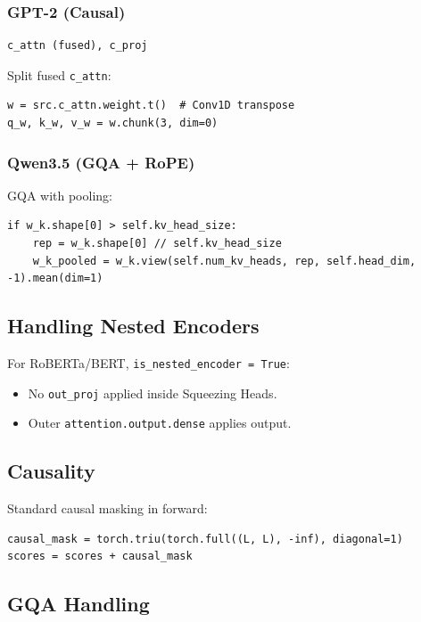 \subsubsection{GPT-2 (Causal)}

\begin{lstlisting}
c_attn (fused), c_proj
\end{lstlisting}

Split fused \texttt{c\_attn}:

\begin{lstlisting}
w = src.c_attn.weight.t()  # Conv1D transpose
q_w, k_w, v_w = w.chunk(3, dim=0)
\end{lstlisting}

\subsubsection{Qwen3.5 (GQA + RoPE)}

GQA with pooling:

\begin{lstlisting}
if w_k.shape[0] > self.kv_head_size:
    rep = w_k.shape[0] // self.kv_head_size
    w_k_pooled = w_k.view(self.num_kv_heads, rep, self.head_dim, -1).mean(dim=1)
\end{lstlisting}

\subsection{Handling Nested Encoders}

For RoBERTa/BERT, \texttt{is\_nested\_encoder = True}:
\begin{itemize}
\item No \texttt{out\_proj} applied inside Squeezing Heads.
\item Outer \texttt{attention.output.dense} applies output.

\end{itemize}
\subsection{Causality}

Standard causal masking in forward:

\begin{lstlisting}
causal_mask = torch.triu(torch.full((L, L), -inf), diagonal=1)
scores = scores + causal_mask
\end{lstlisting}

\subsection{GQA Handling}

